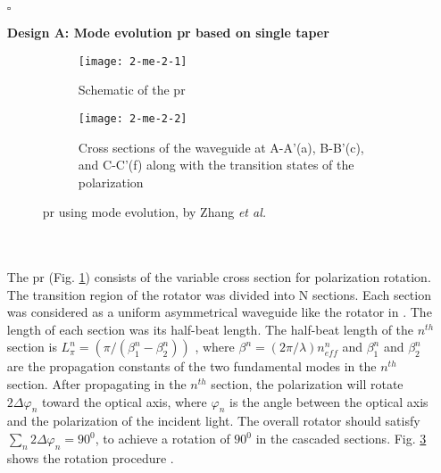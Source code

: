 \documentclass[../report.tex]{subfiles}
\begin{document}
\begin{itemize}[leftmargin=*]
	\item[$\square$] \begin{minipage}[t]{\textwidth}\textbf{Design A: Mode evolution \gls{pr} based on single taper}
	\begin{figure}[H] %
		\begin{subfigure}[t]{0.45\textwidth}
			\texttt{[image: 2-me-2-1]}
			\caption{Schematic of the \gls{pr}}
			\label{fig:2_me_2_1}
		\end{subfigure}
		\hfill
		\begin{subfigure}[t]{0.45\textwidth}
			\texttt{[image: 2-me-2-2]}
			\caption{Cross sections of the waveguide at A-A'(a), B-B'(c), and C-C'(f) along with the transition states of the polarization}
			\label{fig:2_me_2_2}
		\end{subfigure}
		\caption{\gls{pr} using mode evolution, by Zhang \textit{et al.} \cite{zhang_selected_2010}}
	\end{figure}
	\end{minipage}\\\\
	\noindent The \gls{pr} (Fig. \ref{fig:2_me_2_1}) consists of the  variable cross section for polarization rotation. The transition region of the rotator was divided into N sections. Each section was considered as a uniform asymmetrical waveguide like the rotator in \cite{wang_ultrasmall_2008}. The length of each section was its half-beat length. The half-beat length of the $n^{th}$ section is $L_{\pi }^{n}=\left( \pi  / \left( \beta _{1}^{n} - \beta _{2}^{n}\right) \right)$ , where $\beta ^{n}=\left( 2\pi / \lambda \right) n_{eff}^{n}$ and $\beta _{1}^{n}$ and $\beta _{2}^{n}$ are the propagation constants of the two fundamental modes in the $n^{th}$ section. After propagating in the $n^{th}$ section, the polarization will rotate $2\Delta \varphi _{n}$ toward the optical axis, where $\varphi _{n}$ is the angle between the optical axis and the polarization of the incident light. The overall rotator should satisfy $\sum _{n}2\Delta \varphi _{n}=90^{0}$, to achieve a rotation of $90^{0}$ in the cascaded sections. Fig. \ref{fig:2_me_2_2} shows the rotation procedure \cite{zhang_selected_2010}.
			

\end{itemize}
\end{document}
